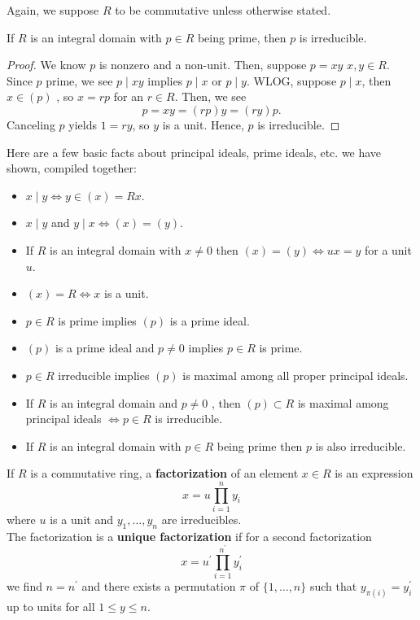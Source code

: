 Again, we suppose \(R\) to be commutative unless otherwise stated.
\begin{proposition}
	If \(R\) is an integral domain with \(p \in R\) being prime, then \(p\) is irreducible.
\end{proposition}
\begin{proof}
	We know \(p\) is nonzero and a non-unit. Then, suppose \(p = xy\)  \(x, y \in R\). Since \(p\) prime, we see \(p \mid xy\) implies \(p \mid x\) or \(p \mid y\). WLOG, suppose \(p \mid x\), then \(x \in\left( p \right) \) , so \(x = rp\) for an \(r \in R\). Then, we see \[
		p = xy = \left( rp \right) y = \left( ry \right) p
	.\]
	Canceling \(p\) yields \(1 = ry\), so \(y\) is a unit. Hence, \(p\) is irreducible.
\end{proof}
\begin{remark}
	Here are a few basic facts about principal ideals, prime ideals, etc. we have shown, compiled together:
	\begin{itemize}
		\item \(x \mid y \iff y \in \left( x \right) = Rx\).
		\item \(x \mid y\) and \(y \mid x \iff \left( x \right)  = \left( y \right) \).
		\item  If \(R\) is an integral domain with \(x \neq 0\) then \(\left( x \right)  = \left( y \right) \iff ux = y\) for a unit \(u\).
		\item \(\left( x \right)  = R \iff x\) is a unit.
		\item \(p \in R\) is prime implies \(\left( p \right)\)  is a prime ideal.
		\item \(\left( p \right) \) is a prime ideal and \(p \neq 0\) implies \(p \in R\) is prime.
		\item \(p \in R\) irreducible implies \(\left( p \right) \)  is maximal among all proper principal ideals.
		\item If \(R\) is an integral domain and \(p \neq 0\) , then \(\left( p \right) \subset R\) is maximal among principal ideals \(\iff p \in R\) is irreducible.
		\item If \(R\) is an integral domain with \(p \in R\) being prime then \(p\) is also irreducible.
	\end{itemize}
\end{remark}
\begin{definition}[Factorization]
If \(R\) is a commutative ring, a \textbf{factorization} of an element \(x \in R\) is an expression \[
x = u \prod_{i= 1}^{n} y_{i}
\] where \(u\) is a unit and \(y_1, \ldots, y_{n}\) are irreducibles.\\
The factorization is a \textbf{unique factorization} if for a second factorization \[
x = u^{\prime} \prod_{i= 1}^{n^{\prime}} y^{\prime}_{i}
\] we find \(n = n^{\prime}\) and there exists a permutation \(\pi\) of \(\{1, \ldots, n\} \) such that \(y_{\pi\left( i \right) }  =y^{\prime}_{i}\) up to units for all \(1 \le y \le n\).
\end{definition}

